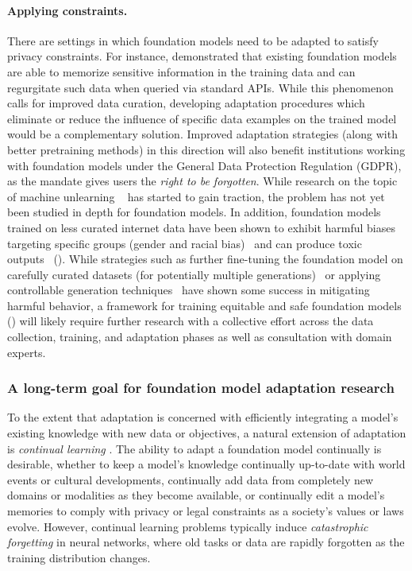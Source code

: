 \paragraph{Applying constraints.} There are settings in which foundation models need to be adapted to satisfy privacy constraints. For instance, \citet{carlini2020extracting} demonstrated that existing foundation models are able to memorize sensitive information in the training data and can regurgitate such data when queried via standard APIs.
While this phenomenon calls for improved data curation, developing adaptation procedures which eliminate or reduce the influence of specific data examples on the trained model would be a complementary solution.
Improved adaptation strategies (along with better pretraining methods) in this direction will also benefit institutions working with foundation models under the General Data Protection Regulation (GDPR), as the mandate gives users the \emph{right to be forgotten}.
While research on the topic of machine unlearning ~\citep{bourtoule2019machine,cao2015towards} has started to gain traction, the problem has not yet been studied in depth for foundation models.
In addition, foundation models trained on less curated internet data have been shown to exhibit harmful biases targeting specific groups (\eg gender and racial bias)~\citep{bender2021,basta2019evaluating,kurita2019measuring,sheng-etal-2019-woman} and can produce toxic outputs~\citep{gehman-etal-2020-realtoxicityprompts} ().
While strategies such as further fine-tuning the foundation model on carefully curated datasets (for potentially multiple generations)~\citep{solaiman2021process} or applying controllable generation techniques~\citep{keskar2019ctrl} have shown some success in mitigating harmful behavior, a framework for training equitable and safe foundation models () will likely require further research with a collective effort across the data collection, training, and adaptation phases as well as consultation with domain experts.

\subsubsection{A long-term goal for foundation model adaptation research}
To the extent that adaptation is concerned with efficiently integrating a model's existing knowledge with new data or objectives, a natural extension of adaptation is \textit{continual learning} \cite{mccloskey1989catastrophic,parisi2018continual}. The ability to adapt a foundation model continually is desirable, whether to keep a model's knowledge continually up-to-date with world events or cultural developments, continually add data from completely new domains or modalities as they become available, or continually edit a model's memories to comply with privacy or legal constraints as a society's values or laws evolve. However, continual learning problems typically induce \textit{catastrophic forgetting} \cite{mccloskey1989catastrophic,Ratcliff1990ConnectionistMO,catastroph} in neural networks, where old tasks or data are rapidly forgotten as the training distribution changes.


